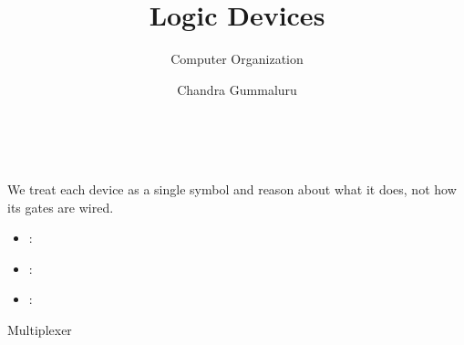 \documentclass[mathserif, handout]{beamer}
\title{Logic Devices}
\subtitle{Computer Organization}
\author[C. Gummaluru]{Chandra Gummaluru}
\institute[]{\url{chandra-gummaluru.github.io} }
\date[Computer Organization]{}
\begin{document}
\begin{frame}
  \maketitle
\end{frame}

\begin{frame}
  \begin{center}
     \\[2mm]
  \end{center}
\end{frame}

\begin{frame}
  We treat each device as a single symbol and reason about what it does, not how its gates are wired.\\[3mm]
  \begin{itemize}
    \item {}:  \\[2mm]
    \item {}:  \\[2mm]
    \item {}: 
  \end{itemize}
\end{frame}

\begin{frame}{Multiplexer}
  \begin{center}
    \Large {}
  \end{center}
\end{frame}
\end{document}
